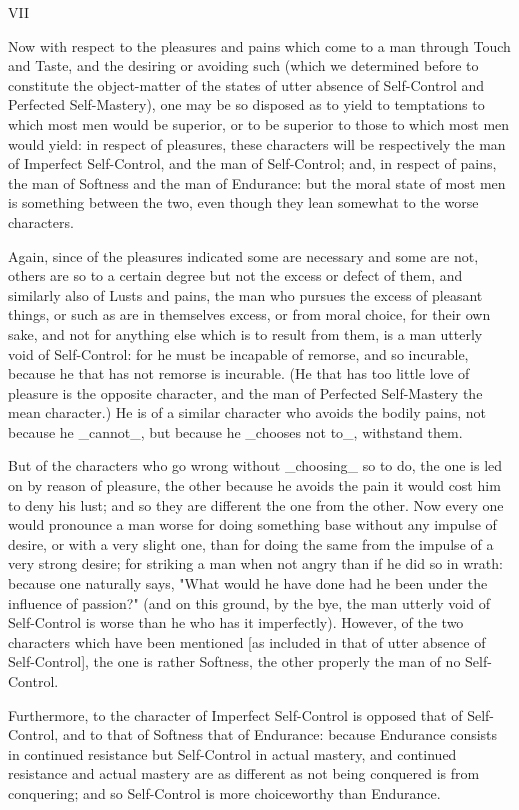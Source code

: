 VII

Now with respect to the pleasures and pains which come to a man through
Touch and Taste, and the desiring or avoiding such (which we determined
before to constitute the object-matter of the states of utter absence of
Self-Control and Perfected Self-Mastery), one may be so disposed as
to yield to temptations to which most men would be superior, or to
be superior to those to which most men would yield: in respect of
pleasures, these characters will be respectively the man of Imperfect
Self-Control, and the man of Self-Control; and, in respect of pains, the
man of Softness and the man of Endurance: but the moral state of most
men is something between the two, even though they lean somewhat to the
worse characters.

Again, since of the pleasures indicated some are necessary and some are
not, others are so to a certain degree but not the excess or defect of
them, and similarly also of Lusts and pains, the man who pursues the
excess of pleasant things, or such as are in themselves excess, or from
moral choice, for their own sake, and not for anything else which is to
result from them, is a man utterly void of Self-Control: for he must be
incapable of remorse, and so incurable, because he that has not remorse
is incurable. (He that has too little love of pleasure is the opposite
character, and the man of Perfected Self-Mastery the mean character.) He
is of a similar character who avoids the bodily pains, not because he
_cannot_, but because he _chooses not to_, withstand them.

But of the characters who go wrong without _choosing_ so to do, the one
is led on by reason of pleasure, the other because he avoids the pain it
would cost him to deny his lust; and so they are different the one from
the other. Now every one would pronounce a man worse for doing something
base without any impulse of desire, or with a very slight one, than for
doing the same from the impulse of a very strong desire; for striking
a man when not angry than if he did so in wrath: because one naturally
says, "What would he have done had he been under the influence of
passion?" (and on this ground, by the bye, the man utterly void of
Self-Control is worse than he who has it imperfectly). However, of the
two characters which have been mentioned [as included in that of utter
absence of Self-Control], the one is rather Softness, the other properly
the man of no Self-Control.

Furthermore, to the character of Imperfect Self-Control is opposed that
of Self-Control, and to that of Softness that of Endurance: because
Endurance consists in continued resistance but Self-Control in actual
mastery, and continued resistance and actual mastery are as different
as not being conquered is from conquering; and so Self-Control is more
choiceworthy than Endurance.

